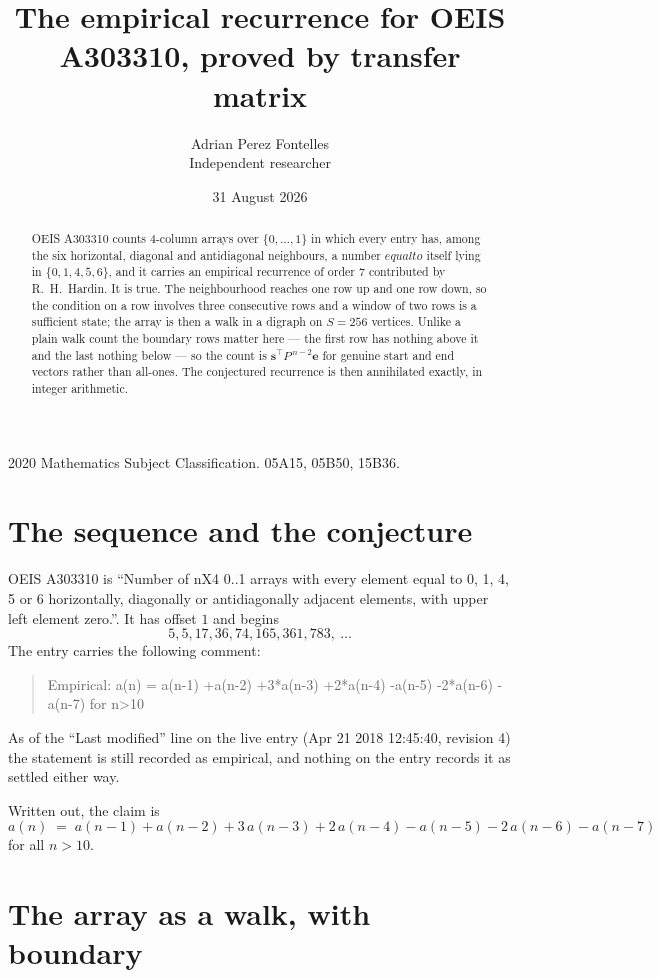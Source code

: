 \documentclass[11pt,a4paper]{article}
\title{The empirical recurrence for OEIS A303310, proved by transfer matrix}
\author{Adrian Perez Fontelles\\ \small Independent researcher}
\date{31 August 2026}
\theoremstyle{plain}
\theoremstyle{definition}
\begin{document}
\maketitle

\begin{abstract}
OEIS A303310 counts $4$-column arrays over $\{0,\dots,1\}$ in which every entry has,
among the six horizontal, diagonal and antidiagonal neighbours, a number $equal to$ itself lying in $\{0,1,4,5,6\}$, and it carries an empirical
recurrence of order $7$ contributed by R.~H.~Hardin. It is true. The neighbourhood
reaches one row up and one row down, so the condition on a row involves three consecutive
rows and a window of two rows is a sufficient state; the array is then a walk in a digraph
on $S=256$ vertices. Unlike a plain walk count the boundary rows matter here --- the first
row has nothing above it and the last nothing below --- so the count is
$\mathbf{s}^{\!\top}P^{\,n-2}\mathbf{e}$ for genuine start and end vectors rather than
all-ones. The conjectured recurrence is then annihilated exactly, in integer arithmetic.
\end{abstract}

\noindent\small 2020 Mathematics Subject Classification. 05A15, 05B50, 15B36.\normalsize

\section{The sequence and the conjecture}

OEIS A303310 is ``Number of nX4 0..1 arrays with every element equal to 0, 1, 4, 5 or 6 horizontally, diagonally or antidiagonally adjacent elements, with upper left element zero.''. It has offset
$1$ and begins
\[
5, 5, 17, 36, 74, 165, 361, 783,\ \dots
\]
The entry carries the following comment:
\begin{quote}\small
Empirical: a(n) = a(n-1) +a(n-2) +3*a(n-3) +2*a(n-4) -a(n-5) -2*a(n-6) -a(n-7) for n>10
\end{quote}
As of the ``Last modified'' line on the live entry (Apr 21 2018 12:45:40, revision
4) the statement is still recorded as empirical, and nothing on the entry
records it as settled either way.

Written out, the claim is
\begin{equation}\label{eq:conj}
a(n)\;=\;a(n-1) + a(n-2) + 3\,a(n-3) + 2\,a(n-4) - a(n-5) - 2\,a(n-6) - a(n-7)
\end{equation}
for all $n>10$.

\section{The array as a walk, with boundary}
\end{document}
